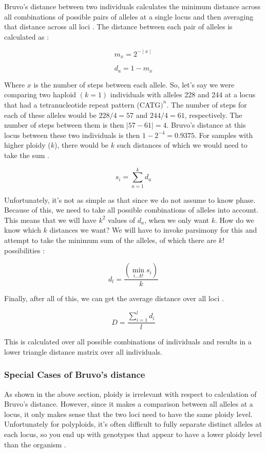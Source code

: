 \documentclass[letterpaper]{article}\usepackage[]{graphicx}\usepackage[]{color}
\newcommand{\beq}{\begin{equation}}
\newcommand{\eeq}{\end{equation}}
\newcommand{\tab}{\hspace*{1em}}
\begin{document}
\tab \tab Bruvo's distance between two individuals calculates the minimum distance across all combinations of possible pairs of alleles at a single locus and then averaging that distance across all loci \cite{Bruvo:2004}. The distance between each pair of alleles is calculated as \cite{Bruvo:2004}:

\beq
\label{eq:m_x}
m_x = 2^{-\mid x \mid}
\eeq

\beq
\label{eq:d_a}
d_a = 1 - m_x
\eeq

Where $x$ is the number of steps between each allele. So, let's say we were comparing two haploid $(k = 1)$ individuals with alleles 228 and 244 at a locus that had a tetranucleotide repeat pattern (CATG$)^n$. The number of steps for each of these alleles would be $228/4 = 57$ and $244/4 =61$, respectively. The number of steps between them is then $\mid 57 - 61 \mid = 4$. Bruvo's distance at this locus between these two individuals is then $1-2^{-4} = 0.9375$. For samples with higher ploidy ($k$), there would be $k$ such distances of which we would need to take the sum \cite{Bruvo:2004}.

\beq
\label{eq:s_i}
s_i = \displaystyle \sum_{a=1}^{k} d_a
\eeq

Unfortunately, it's not as simple as that since we do not assume to know phase. Because of this, we need to take all possible combinations of alleles into account. This means that we will have $k^2$ values of $d_a$, when we only want $k$. How do we know which $k$ distances we want? We will have to invoke parsimony for this and attempt to take the minimum sum of the alleles, of which there are $k!$ possibilities \cite{Bruvo:2004}:

\beq
\label{eq:d_l}
d_l = \frac{\left(\displaystyle \min_{i \dotsc k!} s_i\right)}{k}
\eeq

Finally, after all of this, we can get the average distance over all loci \cite{Bruvo:2004}. 

\beq
\label{eq:D}
D = \frac{\displaystyle \sum_{i=1}^l d_i}{l}
\eeq

This is calculated over all possible combinations of individuals and results in a lower triangle distance matrix over all individuals. 

\subsubsection{Special Cases of Bruvo's distance}\label{appendix:algorithm:bruvospecial}
\tab\tab As shown in the above section, ploidy is irrelevant with respect to calculation of Bruvo's distance. However, since it makes a comparison between all alleles at a locus, it only makes sense that the two loci need to have the same ploidy level. Unfortunately for polyploids, it's often difficult to fully separate distinct alleles at each locus, so you end up with genotypes that appear to have a lower ploidy level than the organism \cite{Bruvo:2004}. 
\end{document}
